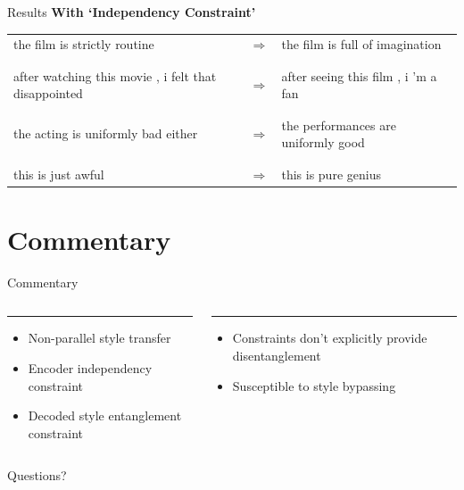 \documentclass{beamer}
\begin{document}
\begin{frame}{Results}
  \centering
  {\large \textbf{With `Independency Constraint'}} \\
  \vspace{1cm}
  \small
  \begin{tabular}{ p{.4\linewidth} p{.05\linewidth} p{.4\linewidth} }
    the film is strictly routine & $\Rightarrow$ & the film is full of imagination \\  \\
    \hline \\
    after watching this movie , i felt that disappointed & $\Rightarrow$ & after seeing this film , i 'm a fan \\  \\
    \hline \\
    the acting is uniformly bad either & $\Rightarrow$ & the performances are uniformly good \\  \\
    \hline \\
    this is just awful & $\Rightarrow$ & this is pure genius
  \end{tabular}
\end{frame}

\section{Commentary}
\begin{frame}{Commentary}
  \begin{columns}[T] %
    \begin{column}{.48\textwidth}
    \color{tropicalrainforest}\rule{\linewidth}{4pt}
    \begin{itemize}
      \item Non-parallel style transfer
      \item Encoder independency constraint
      \item Decoded style entanglement constraint
    \end{itemize}
    \end{column}%
    \hfill%
    \begin{column}{.48\textwidth}
    \color{usccardinal}\rule{\linewidth}{4pt}
    \begin{itemize}
      \item Constraints don't explicitly provide disentanglement
      \item Susceptible to style bypassing
    \end{itemize}
    \end{column}%
  \end{columns}
\end{frame}

\begin{frame}
  \centering
  \Huge{Questions?}
\end{frame}
\end{document}
